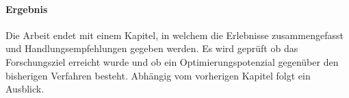 \paragraph{Ergebnis}
Die Arbeit endet mit einem Kapitel, in welchem die Erlebnisse zusammengefasst und Handlungsempfehlungen gegeben werden.
Es wird geprüft ob das Forschungsziel erreicht wurde und ob ein Optimierungspotenzial gegenüber den bisherigen Verfahren besteht.
Abhängig vom vorherigen Kapitel folgt ein Ausblick.
